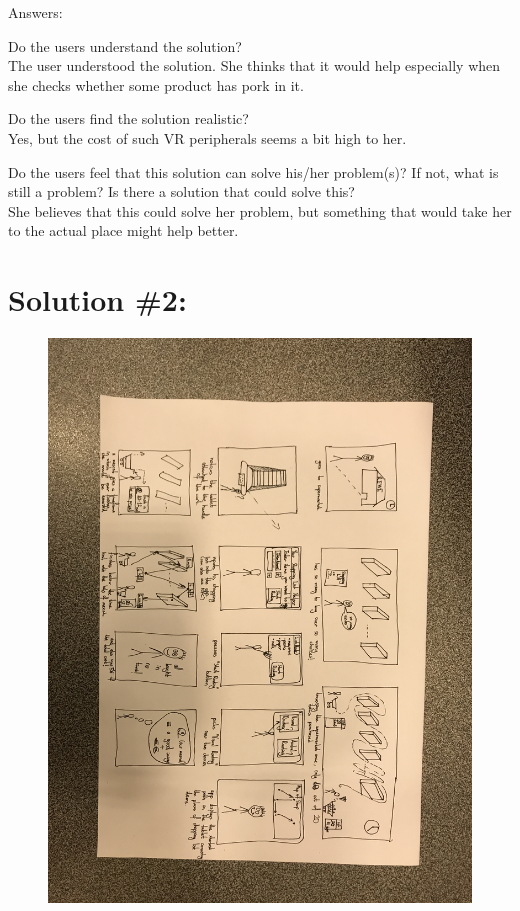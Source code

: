\documentclass[a4paper,10pt,oneside]{scrreprt}
\begin{document}
Answers:
\begin{compactitem}
	\item Do the users understand the solution?\\
	The user understood the solution. She thinks that it would help especially when she checks whether some product has pork in it.\\
	
	\item Do the users find the solution realistic?\\
	Yes, but the cost of such VR peripherals seems a bit high to her.\\
	
	\item Do the users feel that this solution can solve his/her problem(s)? If not, what is still
	a problem? Is there a solution that could solve this?\\
	She believes that this could solve her problem, but something that would take her to the actual place might help better.\\
	
\end{compactitem}

\clearpage

\section{Solution \#2:}
\begin{figure}[h]
	\centering
	\includegraphics[scale=0.16, clip, trim={71em 35em 33em 43em}]{images/s2.jpg}
\end{figure}
\end{document}
